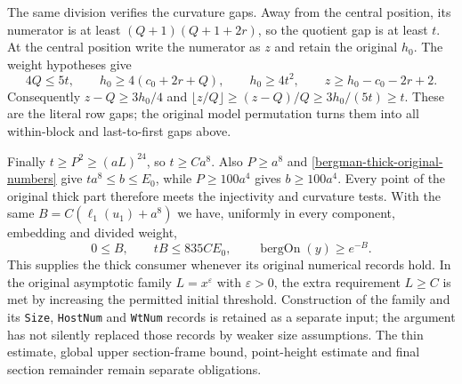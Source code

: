 The same division verifies the curvature gaps.  Away from the
central position, its numerator is at least
$(Q+1)(Q+1+2r)$, so the quotient gap is at least $t$.
At the central position write the numerator as $z$ and retain
the original $h_0$.  The weight hypotheses give
\[
 4Q\leq5t,\qquad
 h_0\geq4(c_0+2r+Q),\qquad h_0\geq4t^2,\qquad
 z\geq h_0-c_0-2r+2.
\]
Consequently $z-Q\geq3h_0/4$ and
$\lfloor z/Q\rfloor\geq(z-Q)/Q\geq3h_0/(5t)\geq t$.
These are the literal row gaps; the original model permutation
turns them into all within-block and last-to-first gaps above.

Finally $t\geq P^2\geq(aL)^{24}$, so $t\geq Ca^8$.
Also $P\geq a^8$ and \eqref{bergman-thick-original-numbers} give
$ta^8\leq b\leq E_0$, while $P\geq100a^4$ gives
$b\geq100a^4$.  Every point of the original thick part therefore
meets the injectivity and curvature tests.  With the same
$B=C(\ell_1(u_1)+a^8)$ we have, uniformly in every component,
embedding and divided weight,
\begin{equation}\label{bergman-thick-original-budget}
             0\leq B,\qquad tB\leq835C E_0,
             \qquad \operatorname{bergOn}(y)\geq e^{-B}.
\end{equation}
This supplies the thick consumer whenever its original numerical
records hold.  In the original asymptotic family $L=x^\varepsilon$
with $\varepsilon>0$, the extra requirement $L\geq C$ is met by
increasing the permitted initial threshold.  Construction of the
family and its \texttt{Size}, \texttt{HostNum} and \texttt{WtNum}
records is retained as a separate input; the argument has not
silently replaced those records by weaker size assumptions.
The thin estimate, global upper section-frame bound, point-height
estimate and final section remainder remain separate obligations.
